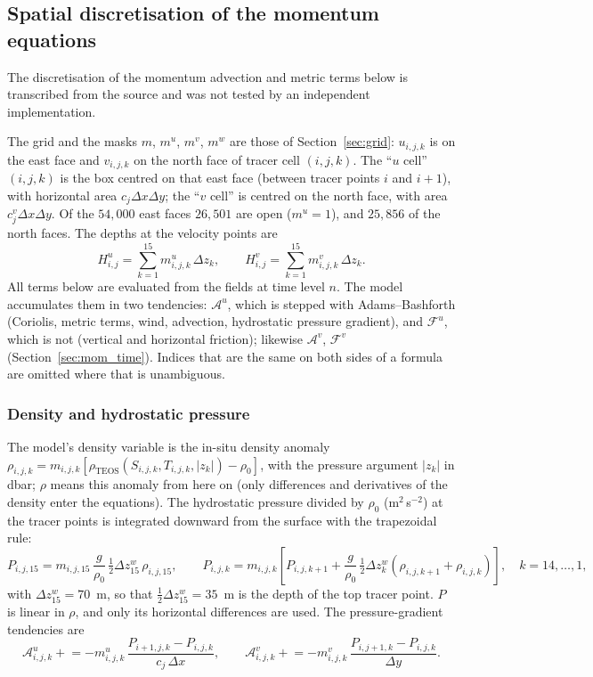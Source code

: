 \documentclass{article}
\begin{document}
\subsection{Spatial discretisation of the momentum equations}\label{sec:mom_discrete}

The discretisation of the momentum advection and metric terms below is transcribed from the source and was not tested by an independent implementation.

The grid and the masks $m$, $m^u$, $m^v$, $m^w$ are those of Section~\ref{sec:grid}: $u_{i,j,k}$ is on the east face and $v_{i,j,k}$ on the north face of tracer cell $(i,j,k)$.
The ``$u$ cell'' $(i,j,k)$ is the box centred on that east face (between tracer points $i$ and $i+1$), with horizontal area $c_j\Delta x\Delta y$; the ``$v$ cell'' is centred on the north face, with area $c^v_j\Delta x\Delta y$.
Of the $54{,}000$ east faces $26{,}501$ are open ($m^u = 1$), and $25{,}856$ of the north faces.
The depths at the velocity points are
\[
H^u_{i,j} = \sum_{k=1}^{15} m^u_{i,j,k}\,\Delta z_k, \qquad H^v_{i,j} = \sum_{k=1}^{15} m^v_{i,j,k}\,\Delta z_k .
\]
All terms below are evaluated from the fields at time level $n$.
The model accumulates them in two tendencies: $\mathcal{A}^u$, which is stepped with Adams--Bashforth (Coriolis, metric terms, wind, advection, hydrostatic pressure gradient), and $\mathcal{F}^u$, which is not (vertical and horizontal friction); likewise $\mathcal{A}^v$, $\mathcal{F}^v$ (Section~\ref{sec:mom_time}).
Indices that are the same on both sides of a formula are omitted where that is unambiguous.

\subsubsection*{Density and hydrostatic pressure}
The model's density variable is the in-situ density anomaly $\rho_{i,j,k} = m_{i,j,k}\left[ \rho_\text{TEOS}(S_{i,j,k}, T_{i,j,k}, |z_k|) - \rho_0 \right]$, with the pressure argument $|z_k|$ in dbar; $\rho$ means this anomaly from here on (only differences and derivatives of the density enter the equations).
The hydrostatic pressure divided by $\rho_0$ (m$^2$\,s$^{-2}$) at the tracer points is integrated downward from the surface with the trapezoidal rule:
\[
P_{i,j,15} = m_{i,j,15}\,\frac{g}{\rho_0}\,\tfrac12\Delta z^w_{15}\,\rho_{i,j,15},
\qquad
P_{i,j,k} = m_{i,j,k}\left[ P_{i,j,k+1} + \frac{g}{\rho_0}\,\tfrac12\Delta z^w_k \left( \rho_{i,j,k+1} + \rho_{i,j,k} \right) \right], \quad k = 14,\dots,1,
\]
with $\Delta z^w_{15} = 70$~m, so that $\tfrac12\Delta z^w_{15} = 35$~m is the depth of the top tracer point.
$P$ is linear in $\rho$, and only its horizontal differences are used.
The pressure-gradient tendencies are
\[
\mathcal{A}^u_{i,j,k} \mathrel{+}= -m^u_{i,j,k}\,\frac{P_{i+1,j,k} - P_{i,j,k}}{c_j\,\Delta x},
\qquad
\mathcal{A}^v_{i,j,k} \mathrel{+}= -m^v_{i,j,k}\,\frac{P_{i,j+1,k} - P_{i,j,k}}{\Delta y}.
\]
\end{document}
